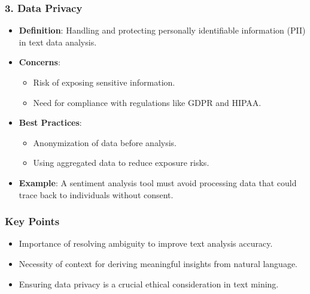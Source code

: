 \documentclass[aspectratio=169]{beamer}
\begin{document}
\begin{frame}[fragile]
    \frametitle{3. Data Privacy}
    \begin{itemize}
        \item \textbf{Definition}: Handling and protecting personally identifiable information (PII) in text data analysis.
        
        \item \textbf{Concerns}:
        \begin{itemize}
            \item Risk of exposing sensitive information.
            \item Need for compliance with regulations like GDPR and HIPAA.
        \end{itemize}
        
        \item \textbf{Best Practices}:
        \begin{itemize}
            \item Anonymization of data before analysis.
            \item Using aggregated data to reduce exposure risks.
        \end{itemize}
        
        \item \textbf{Example}: A sentiment analysis tool must avoid processing data that could trace back to individuals without consent.
    \end{itemize}
\end{frame}

\begin{frame}[fragile]
    \frametitle{Key Points}
    \begin{itemize}
        \item Importance of resolving ambiguity to improve text analysis accuracy.
        \item Necessity of context for deriving meaningful insights from natural language.
        \item Ensuring data privacy is a crucial ethical consideration in text mining.
    \end{itemize}
\end{frame}
\end{document}
